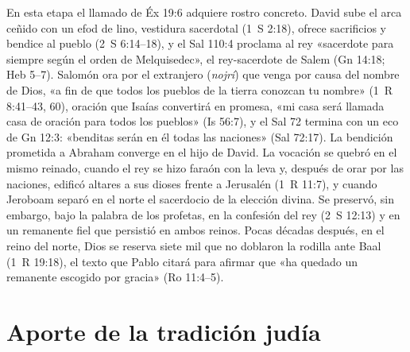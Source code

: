 En esta etapa el llamado de Éx 19:6 adquiere rostro concreto. David sube el arca ceñido con un efod de lino, vestidura sacerdotal (1~S 2:18), ofrece sacrificios y bendice al pueblo (2~S 6:14--18), y el Sal 110:4 proclama al rey «sacerdote para siempre según el orden de Melquisedec», el rey-sacerdote de Salem (Gn 14:18; Heb 5--7). Salomón ora por el extranjero (\emph{nojrí}) que venga por causa del nombre de Dios, «a fin de que todos los pueblos de la tierra conozcan tu nombre» (1~R 8:41--43, 60), oración que Isaías convertirá en promesa, «mi casa será llamada casa de oración para todos los pueblos» (Is 56:7), y el Sal 72 termina con un eco de Gn 12:3: «benditas serán en él todas las naciones» (Sal 72:17). La bendición prometida a Abraham converge en el hijo de David. La vocación se quebró en el mismo reinado, cuando el rey se hizo faraón con la leva y, después de orar por las naciones, edificó altares a sus dioses frente a Jerusalén (1~R 11:7), y cuando Jeroboam separó en el norte el sacerdocio de la elección divina. Se preservó, sin embargo, bajo la palabra de los profetas, en la confesión del rey (2~S 12:13) y en un remanente fiel que persistió en ambos reinos. Pocas décadas después, en el reino del norte, Dios se reserva siete mil que no doblaron la rodilla ante Baal (1~R 19:18), el texto que Pablo citará para afirmar que «ha quedado un remanente escogido por gracia» (Ro 11:4--5).

\section{Aporte de la tradición judía}

